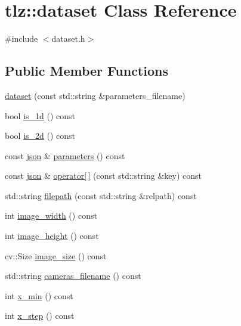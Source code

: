 \hypertarget{classtlz_1_1dataset}{}\section{tlz\+:\+:dataset Class Reference}
\label{classtlz_1_1dataset}


{\ttfamily \#include $<$dataset.\+h$>$}

\subsection*{Public Member Functions}
\begin{DoxyCompactItemize}
\item 
\hyperlink{classtlz_1_1dataset_aebc24cf832f868716dcc9be82b790af2}{dataset} (const std\+::string \&parameters\+\_\+filename)
\item 
bool \hyperlink{classtlz_1_1dataset_af8d9906e7734ce5ffafcdeabfa687b33}{is\+\_\+1d} () const 
\item 
bool \hyperlink{classtlz_1_1dataset_a3623ef5d2922b36ca94b4982ba17e9fe}{is\+\_\+2d} () const 
\item 
const \hyperlink{namespacetlz_ac400657dfcddf6309a769aefc23eed0c}{json} \& \hyperlink{classtlz_1_1dataset_ab14f5b1f18c0ab423c18270b7ca46bd2}{parameters} () const 
\item 
const \hyperlink{namespacetlz_ac400657dfcddf6309a769aefc23eed0c}{json} \& \hyperlink{classtlz_1_1dataset_aa1dfdec1ee0dc33a17499320b884d4d9}{operator\mbox{[}$\,$\mbox{]}} (const std\+::string \&key) const 
\item 
std\+::string \hyperlink{classtlz_1_1dataset_ab8608e42b4bceb12855fb676c725d9c5}{filepath} (const std\+::string \&relpath) const 
\item 
int \hyperlink{classtlz_1_1dataset_af0c29591daba3a3ed80f277cacb1856d}{image\+\_\+width} () const 
\item 
int \hyperlink{classtlz_1_1dataset_a85223a0a6c8e1de055f6e85589045e27}{image\+\_\+height} () const 
\item 
cv\+::\+Size \hyperlink{classtlz_1_1dataset_a7aecc40555a69a401c3d3b9c53025fcd}{image\+\_\+size} () const 
\item 
std\+::string \hyperlink{classtlz_1_1dataset_a647992aefd95764f55f8e4e1709ad97a}{cameras\+\_\+filename} () const 
\item 
int \hyperlink{classtlz_1_1dataset_a15180d3b04937d9f1c69041a220b943b}{x\+\_\+min} () const 
\item 
int \hyperlink{classtlz_1_1dataset_a7efef5473f244709a47ff506267652b1}{x\+\_\+step} () const 

\end{DoxyCompactItemize}
